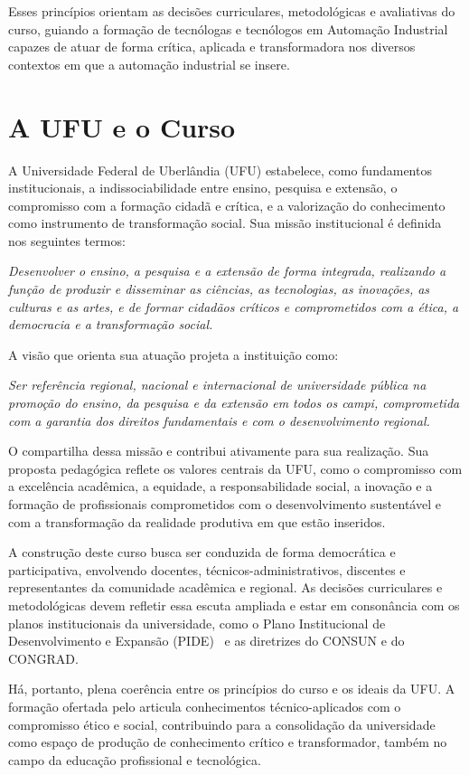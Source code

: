 Esses princípios orientam as decisões curriculares, metodológicas e avaliativas do curso, guiando a formação de tecnólogas e tecnólogos em Automação Industrial capazes de atuar de forma crítica, aplicada e transformadora nos diversos contextos em que a automação industrial se insere.

\section{A UFU e o Curso}

A Universidade Federal de Uberlândia (UFU) estabelece, como fundamentos institucionais, a indissociabilidade entre ensino, pesquisa e extensão, o compromisso com a formação cidadã e crítica, e a valorização do conhecimento como instrumento de transformação social. Sua missão institucional é definida nos seguintes termos:

\begin{displayquote}
\textit{Desenvolver o ensino, a pesquisa e a extensão de forma integrada, realizando a função de produzir e disseminar as ciências, as tecnologias, as inovações, as culturas e as artes, e de formar cidadãos críticos e comprometidos com a ética, a democracia e a transformação social.}
\end{displayquote}

A visão que orienta sua atuação projeta a instituição como:

\begin{displayquote}
\textit{Ser referência regional, nacional e internacional de universidade pública na promoção do ensino, da pesquisa e da extensão em todos os campi, comprometida com a garantia dos direitos fundamentais e com o desenvolvimento regional.}
\end{displayquote}

O \ppccurso compartilha dessa missão e contribui ativamente para sua realização. Sua proposta pedagógica reflete os valores centrais da UFU, como o compromisso com a excelência acadêmica, a equidade, a responsabilidade social, a inovação e a formação de profissionais comprometidos com o desenvolvimento sustentável e com a transformação da realidade produtiva em que estão inseridos.

A construção deste curso busca ser conduzida de forma democrática e participativa, envolvendo docentes, técnicos-administrativos, discentes e representantes da comunidade acadêmica e regional. As decisões curriculares e metodológicas devem refletir essa escuta ampliada e estar em consonância com os planos institucionais da universidade, como o Plano Institucional de Desenvolvimento e Expansão (PIDE)~\cite{ufu_consun_31_2022} e as diretrizes do CONSUN e do CONGRAD.

Há, portanto, plena coerência entre os princípios do curso e os ideais da UFU. A formação ofertada pelo \ppccurso articula conhecimentos técnico-aplicados com o compromisso ético e social, contribuindo para a consolidação da universidade como espaço de produção de conhecimento crítico e transformador, também no campo da educação profissional e tecnológica.
